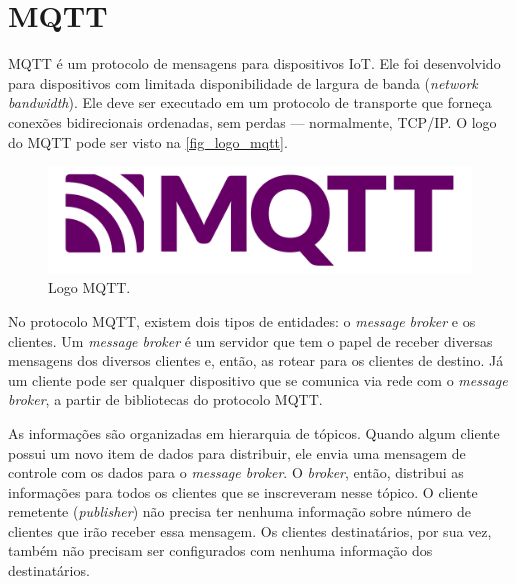 \documentclass[
    12pt,
    openright,
    twoside,
    a4paper,
    english,
    spanish,
    brazil,
    ]{abntex2}
\begin{document}
\section{MQTT}\label{section_mqtt}
MQTT é um protocolo de mensagens para dispositivos IoT. Ele foi desenvolvido para dispositivos com limitada disponibilidade de largura de banda (\textit{network bandwidth}). Ele deve ser executado em um protocolo de transporte que forneça conexões bidirecionais ordenadas, sem perdas — normalmente, TCP/IP. O logo do MQTT pode ser visto na \autoref{fig_logo_mqtt}.
\begin{figure}[htb]
	\caption{Logo MQTT.}\label{fig_logo_mqtt}
	\begin{center}
		\includegraphics[scale=0.3]{Images/logo_mqtt.pdf}
	\end{center}
\end{figure}

No protocolo MQTT, existem dois tipos de entidades: o \textit{message broker} e os clientes. Um \textit{message broker} é um servidor que tem o papel de receber diversas mensagens dos diversos clientes e, então, as rotear para os clientes de destino. Já um cliente pode ser qualquer dispositivo que se comunica via rede com o \textit{message broker}, a partir de bibliotecas do protocolo MQTT.

As informações são organizadas em hierarquia de tópicos. Quando algum cliente possui um novo item de dados para distribuir, ele envia uma mensagem de controle com os dados para o \textit{message broker}. O \textit{broker}, então, distribui as informações para todos os clientes que se inscreveram nesse tópico. O cliente remetente (\textit{publisher}) não precisa ter nenhuma informação sobre número de clientes que irão receber essa mensagem. Os clientes destinatários, por sua vez, também não precisam ser configurados com nenhuma informação dos destinatários.
\end{document}
